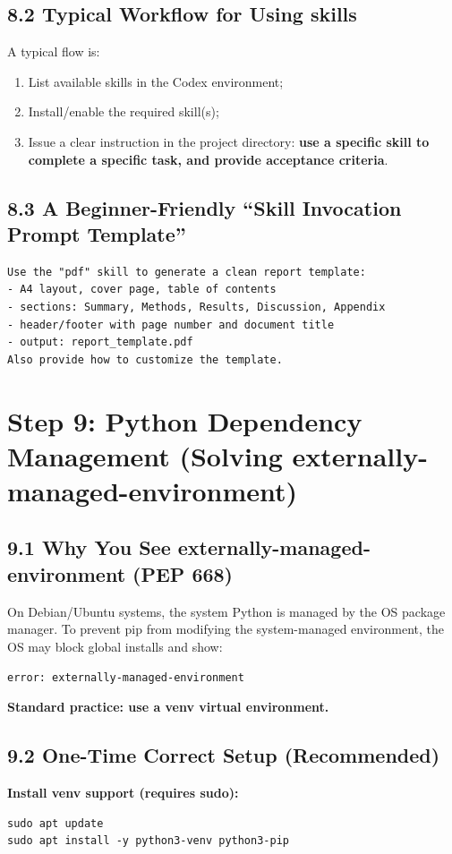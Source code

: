 \documentclass[11pt,a4paper]{article}
\begin{document}
\subsection{8.2 Typical Workflow for Using skills}
A typical flow is:
\begin{enumerate}[leftmargin=1.7em]
  \item List available skills in the Codex environment;
  \item Install/enable the required skill(s);
  \item Issue a clear instruction in the project directory: \textbf{use a specific skill to complete a specific task, and provide acceptance criteria}.
\end{enumerate}

\subsection{8.3 A Beginner-Friendly ``Skill Invocation Prompt Template''}
\begin{lstlisting}
Use the "pdf" skill to generate a clean report template:
- A4 layout, cover page, table of contents
- sections: Summary, Methods, Results, Discussion, Appendix
- header/footer with page number and document title
- output: report_template.pdf
Also provide how to customize the template.
\end{lstlisting}

\section{Step 9: Python Dependency Management (Solving externally-managed-environment)}
\subsection{9.1 Why You See externally-managed-environment (PEP 668)}
On Debian/Ubuntu systems, the system Python is managed by the OS package manager. To prevent pip from modifying the system-managed environment, the OS may block global installs and show:
\begin{center}
\texttt{error: externally-managed-environment}
\end{center}
\textbf{Standard practice: use a venv virtual environment.}

\subsection{9.2 One-Time Correct Setup (Recommended)}
\textbf{Install venv support (requires sudo):}
\begin{lstlisting}
sudo apt update
sudo apt install -y python3-venv python3-pip
\end{lstlisting}
\end{document}
